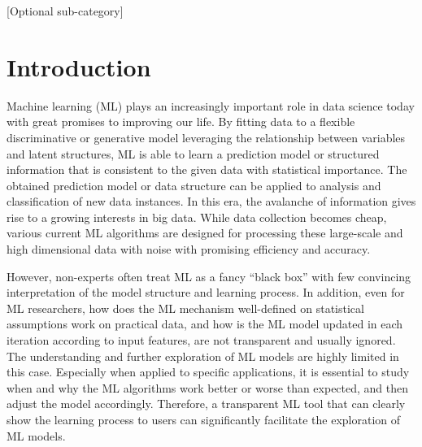 \documentclass{chi2009}
\begin{document}

[Optional sub-category]

\section{Introduction}

Machine learning (ML) plays an increasingly important role in data science today with great promises to improving our life. By fitting data to a flexible discriminative or generative model leveraging the relationship between variables and latent structures, ML is able to learn a prediction model or structured information that is consistent to the given data with statistical importance. The obtained prediction model or data structure can be applied to analysis and classification of new data instances. In this era, the avalanche of information gives rise to a growing interests in big data. While data collection becomes cheap, various current ML algorithms are designed for processing these large-scale and high dimensional data with noise with promising efficiency and accuracy. 

However, non-experts often treat ML as a fancy ``black box'' with few convincing interpretation of the model structure and learning process. In addition, even for ML researchers, how does the ML mechanism well-defined on statistical assumptions work on practical data, and how is the ML model updated in each iteration according to input features, are not transparent and usually ignored. The understanding and further exploration of ML models are highly limited in this case. Especially when applied to specific applications, it is essential to study when and why the ML algorithms work better or worse than expected, and then adjust the model accordingly. Therefore, a transparent ML tool that can clearly show the learning process to users can significantly facilitate the exploration of ML models.
\end{document}

